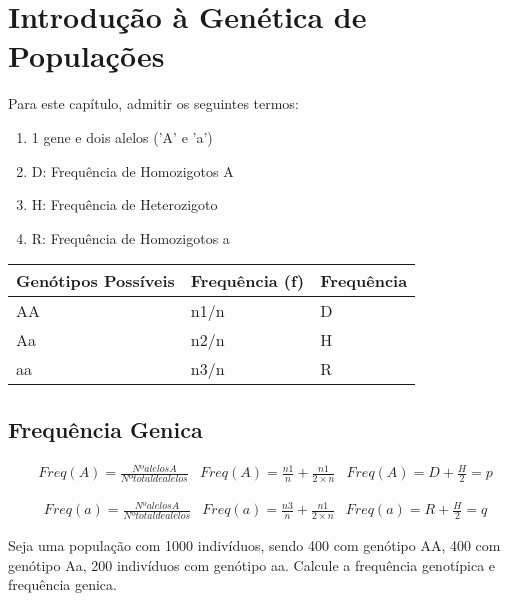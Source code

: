\chapter{Introdução à Genética de Populações}

Para este capítulo, admitir os seguintes termos:

\begin{enumerate}
\item 1 gene e dois alelos ('A' e 'a')
\item D: Frequência de Homozigotos A
\item H: Frequência de Heterozigoto
\item R: Frequência de Homozigotos a
\end{enumerate}


\begin{table}[H]
\centering
\begin{tabular}{l l l}
\toprule
 \textbf{Genótipos Possíveis} & \textbf{Frequência (f)} & \textbf{Frequência}  \\
\midrule
 AA &  n1/n & D \\
 Aa &  n2/n & H \\
 aa &  n3/n & R \\
\bottomrule
\end{tabular}
\end{table}


\section{Frequência Genica}


\begin{definition}
\begin{align}
& Freq(A) = \frac{Nº alelos A}{Nº total de alelos}
& Freq(A) = \frac{n1}{n} + \frac{n1}{2 \times n}
& Freq(A) = D + \frac{H}{2} = p
\end{align}
\end{definition}

\begin{definition}
\begin{align}
& Freq(a) = \frac{Nº alelos A}{Nº total de alelos}
& Freq(a) = \frac{n3}{n} + \frac{n1}{2 \times n}
& Freq(a) = R + \frac{H}{2} = q
\end{align}
\end{definition}


\begin{example}

Seja uma população com 1000 indivíduos, sendo 400 com genótipo AA, 400 com genótipo Aa, 200 indivíduos com genótipo aa. Calcule a frequência genotípica e frequência genica.

\end{example}


